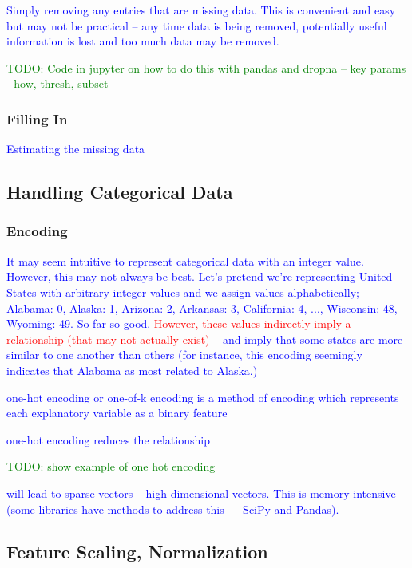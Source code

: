 \textcolor{blue}{Simply removing any entries that are missing data. This is convenient and easy but may not be practical -- any time data is being removed, potentially useful information is lost and too much data may be removed.}

\textcolor{green}{TODO: Code in jupyter on how to do this with pandas and dropna -- key params - how, thresh, subset}

\subsubsection{Filling In}

\textcolor{blue}{Estimating the missing data}

\subsection{Handling Categorical Data}

\subsubsection{Encoding}

\textcolor{blue}{It may seem intuitive to represent categorical data with an integer value. However, this may not always be best. Let's pretend we're representing United States with arbitrary integer values and we assign values alphabetically; Alabama: 0, Alaska: 1, Arizona: 2, Arkansas: 3, California: 4, ..., Wisconsin: 48, Wyoming: 49. So far so good. \textcolor{red}{However, these values indirectly imply a relationship (that may not actually exist)} -- and imply that some states are more similar to one another than others (for instance, this encoding seemingly indicates that Alabama as most related to Alaska.) }

\textcolor{blue}{{one-hot encoding} or one-of-k encoding is a method of encoding which represents each explanatory variable as a binary feature}

\textcolor{blue}{one-hot encoding reduces the relationship}

\textcolor{green}{TODO: show example of one hot encoding}

\textcolor{blue}{will lead to {sparse vectors} -- high dimensional vectors. This is memory intensive (some libraries have methods to address this --- SciPy and Pandas).}

\subsection{Feature Scaling, Normalization}

